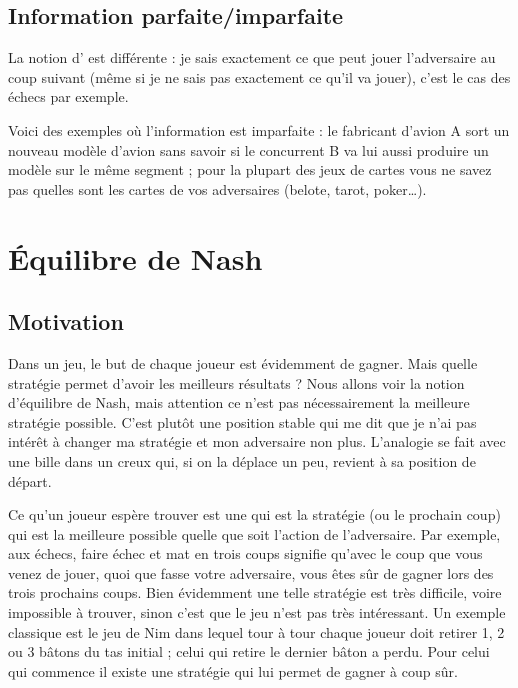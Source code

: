 \documentclass[11pt,class=report,crop=false]{standalone}
\begin{document}
\subsection{Information parfaite/imparfaite}

La notion d' est différente : je sais exactement ce que peut jouer l'adversaire au coup suivant (même si je ne sais pas exactement ce qu'il va jouer), c'est le cas des échecs par exemple.

Voici des exemples où l'information est imparfaite :
le fabricant d'avion A sort un nouveau modèle d'avion sans savoir si le concurrent B va lui aussi produire un modèle sur le même segment ;
pour la plupart des jeux de cartes vous ne savez pas quelles sont les cartes de vos adversaires (belote, tarot, poker\ldots).


	
\section{Équilibre de Nash}


\subsection{Motivation}

Dans un jeu, le but de chaque joueur est évidemment de gagner. Mais quelle stratégie permet d'avoir les meilleurs résultats ?
Nous allons voir la notion \og{}d'équilibre de Nash\fg{}, mais attention ce n'est pas nécessairement la meilleure stratégie possible.
C'est plutôt une position stable qui me dit que je n'ai pas intérêt à changer ma stratégie et mon adversaire non plus. L'analogie se fait avec une bille dans un creux qui, si on la déplace un peu, revient à sa position de départ.


Ce qu'un joueur espère trouver est une  qui est la stratégie (ou le prochain coup) qui est la meilleure possible quelle que soit l'action de l'adversaire.
Par exemple, aux échecs, faire \og{}échec et mat en trois coups\fg{} signifie qu'avec le coup que vous venez de jouer, quoi que fasse votre adversaire, vous êtes sûr de gagner lors des trois prochains coups. 
Bien évidemment une telle stratégie est très difficile, voire impossible à trouver, sinon c'est que le jeu n'est pas très intéressant. Un exemple classique est le jeu de Nim dans lequel tour à tour chaque joueur doit retirer 1, 2 ou 3 bâtons du tas initial ; celui qui retire le dernier bâton a perdu. Pour celui qui commence il existe une stratégie qui lui permet de gagner à coup sûr.
\end{document}
